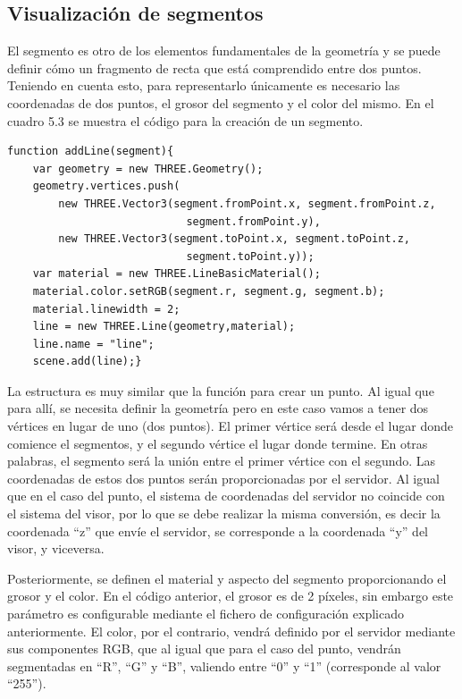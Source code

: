 \subsection{Visualización de segmentos}
El segmento es otro de los elementos fundamentales de la geometría y se puede definir cómo un fragmento de recta que está comprendido entre dos puntos. Teniendo en cuenta esto, para  representarlo únicamente es necesario las coordenadas de dos puntos, el grosor del segmento y el color del mismo. En el cuadro 5.3 se muestra el código para la creación de un segmento.
\begin{lstlisting}[caption= Creación y visualización de segmentos, label=cod.crearsegmento]
function addLine(segment){
	var geometry = new THREE.Geometry();
	geometry.vertices.push(
		new THREE.Vector3(segment.fromPoint.x, segment.fromPoint.z, 
							segment.fromPoint.y),
		new THREE.Vector3(segment.toPoint.x, segment.toPoint.z, 
							segment.toPoint.y));
	var material = new THREE.LineBasicMaterial();
	material.color.setRGB(segment.r, segment.g, segment.b);
	material.linewidth = 2;
	line = new THREE.Line(geometry,material);
	line.name = "line";
	scene.add(line);}
\end{lstlisting}
La estructura es muy similar que la función para crear un punto. Al igual que para allí, se necesita definir la geometría pero en este caso vamos a tener dos vértices en lugar de uno (dos puntos). El primer vértice será desde el lugar donde comience el segmentos, y el segundo vértice el lugar donde termine. En otras palabras, el segmento será la unión entre el primer vértice con el segundo. Las coordenadas de estos dos puntos serán proporcionadas por el servidor. Al igual que en el caso del punto, el sistema de coordenadas del servidor no coincide con el sistema del visor, por lo que se debe realizar la misma conversión, es decir la coordenada ``z'' que envíe el servidor, se corresponde a la coordenada ``y'' del visor, y viceversa.

Posteriormente, se definen el material y aspecto del segmento proporcionando el grosor y el color. En el código anterior, el grosor es de 2 píxeles, sin embargo este parámetro es configurable mediante el fichero de configuración explicado anteriormente. El color, por el contrario, vendrá definido por el servidor mediante sus componentes RGB, que al igual que para el caso del punto, vendrán segmentadas en ``R'', ``G'' y ``B'', valiendo entre ``0''  y ``1'' (corresponde al valor ``255'').

